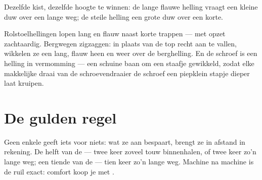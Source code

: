 \begin{omfigure}

{\small Dezelfde kist, dezelfde hoogte te winnen: de lange flauwe
helling vraagt een kleine duw over een lange weg; de steile helling
een grote duw over een korte.}
\end{omfigure}

\begin{example}\label{ex:g5:simple-machines:ramps}
Rolstoelhellingen lopen lang en flauw naast korte trappen --- met
opzet zachtaardig. Bergwegen zigzaggen: in plaats van de top recht aan
te vallen, wikkelen ze een lang, flauw  heen en weer over
de berghelling. En de schroef is een helling in vermomming --- een
schuine baan om een staafje gewikkeld, zodat elke makkelijke draai van
de schroevendraaier de schroef een piepklein stapje dieper laat
kruipen.
\end{example}

\section{De gulden regel}

\begin{proposition}\label{prop:g5:simple-machines:golden}
Geen enkele  geeft iets voor niets: wat ze aan
 bespaart, brengt ze in afstand in rekening. De helft van de
 --- twee keer zoveel touw binnenhalen, of twee keer zo'n lange
weg; een tiende van de  --- tien keer zo'n lange weg. Machine na
machine is de ruil exact: comfort koop je met .
\end{proposition}


